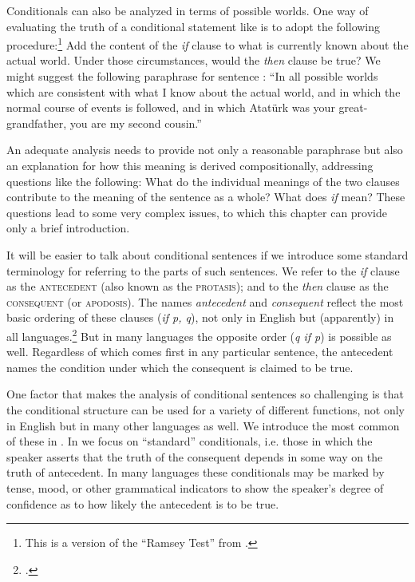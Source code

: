 Conditionals can also be analyzed in terms of possible worlds. One way of evaluating the truth of a conditional statement like  is to adopt the following procedure:\footnote{This is a version of the “Ramsey Test” from \citet{Stalnaker1968}.} Add the content of the \textit{if} clause to what is currently known about the actual world. Under those circumstances, would the \textit{then} clause be true? We might suggest the following paraphrase for sentence : “In all possible worlds which are consistent with what I know about the actual world, and in which the normal course of events is followed, and in which Atatürk was your great-grandfather, you are my second cousin.”



An adequate analysis needs to provide not only a reasonable paraphrase but also an explanation for how this meaning is derived compositionally, addressing questions like the following: What do the individual meanings of the two clauses contribute to the meaning of the sentence as a whole? What does \textit{if} mean? These questions lead to some very complex issues, to which this chapter can provide only a brief introduction.



It will be easier to talk about conditional sentences if we introduce some standard terminology for referring to the parts of such sentences. We refer to the \textit{if} clause as the \textsc{antecedent} (also known as the \textsc{protasis}); and to the \textit{then} clause as the \textsc{consequent} (or \textsc{apodosis}). The names \textit{antecedent} and \textit{consequent} reflect the most basic ordering of these clauses (\textit{if p, q}), not only in English but (apparently) in all languages.\footnote{\textcites[84--85]{Greenberg1963}[83]{Comrie1986}.} But in many languages the opposite order (\textit{q if p}) is possible as well. Regardless of which comes first in any particular sentence, the antecedent names the condition under which the consequent is claimed to be true.



One factor that makes the analysis of conditional sentences so challenging is that the conditional structure can be used for a variety of different functions, not only in English but in many other languages as well. We introduce the most common of these in . In  we focus on “standard” conditionals, i.e. those in which the speaker asserts that the truth of the consequent depends in some way on the truth of antecedent. In many languages these conditionals may be marked by tense, mood, or other grammatical indicators to show the speaker’s degree of confidence as to how likely the antecedent is to be true.



